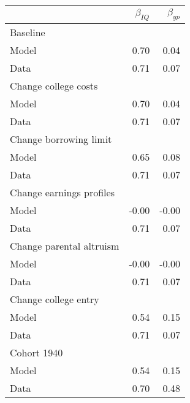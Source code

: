 \begin{tabular}{lrr}
\hline
  & $\beta_{IQ}$  & $\beta_{yp}$  \\ 
\hline
Baseline &   &   \\ 
Model & 0.70  & 0.04  \\ 
Data & 0.71  & 0.07  \\ 
Change college costs &   &   \\ 
Model & 0.70  & 0.04  \\ 
Data & 0.71  & 0.07  \\ 
Change borrowing limit &   &   \\ 
Model & 0.65  & 0.08  \\ 
Data & 0.71  & 0.07  \\ 
Change earnings profiles &   &   \\ 
Model & -0.00  & -0.00  \\ 
Data & 0.71  & 0.07  \\ 
Change parental altruism &   &   \\ 
Model & -0.00  & -0.00  \\ 
Data & 0.71  & 0.07  \\ 
Change college entry &   &   \\ 
Model & 0.54  & 0.15  \\ 
Data & 0.71  & 0.07  \\ 
Cohort 1940 &   &   \\ 
Model & 0.54  & 0.15  \\ 
Data & 0.70  & 0.48  \\ 
\hline
\end{tabular}%
